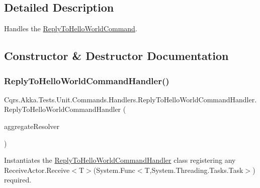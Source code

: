 \subsection{Detailed Description}
Handles the \hyperlink{classCqrs_1_1Akka_1_1Tests_1_1Unit_1_1Commands_1_1ReplyToHelloWorldCommand}{Reply\+To\+Hello\+World\+Command}. 



\subsection{Constructor \& Destructor Documentation}
\mbox{\label{classCqrs_1_1Akka_1_1Tests_1_1Unit_1_1Commands_1_1Handlers_1_1ReplyToHelloWorldCommandHandler_ac3c6ef2299fded8533f7e013e6cf763d_ac3c6ef2299fded8533f7e013e6cf763d}} 
\subsubsection{\texorpdfstring{Reply\+To\+Hello\+World\+Command\+Handler()}{ReplyToHelloWorldCommandHandler()}}
{\footnotesize\ttfamily Cqrs.\+Akka.\+Tests.\+Unit.\+Commands.\+Handlers.\+Reply\+To\+Hello\+World\+Command\+Handler.\+Reply\+To\+Hello\+World\+Command\+Handler (\begin{DoxyParamCaption}\item[{\hyperlink{interfaceCqrs_1_1Akka_1_1Domain_1_1IAkkaAggregateResolver}{I\+Akka\+Aggregate\+Resolver}}]{aggregate\+Resolver }\end{DoxyParamCaption})}



Instantiates the \hyperlink{classCqrs_1_1Akka_1_1Tests_1_1Unit_1_1Commands_1_1Handlers_1_1ReplyToHelloWorldCommandHandler}{Reply\+To\+Hello\+World\+Command\+Handler} class registering any Receive\+Actor.\+Receive$<$\+T$>$(\+System.\+Func$<$\+T,\+System.\+Threading.\+Tasks.\+Task$>$) required. 



